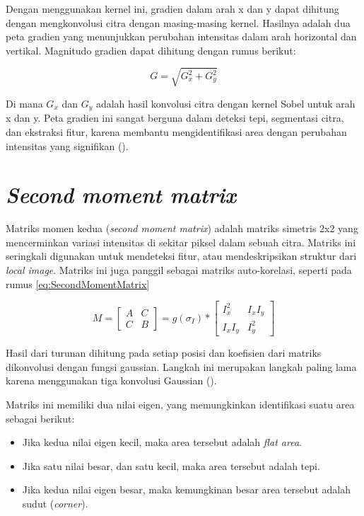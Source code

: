   Dengan menggunakan kernel ini, gradien dalam arah x dan y dapat dihitung dengan mengkonvolusi citra dengan masing-masing kernel. Hasilnya adalah dua peta gradien yang menunjukkan perubahan intensitas dalam arah horizontal dan vertikal. Magnitudo gradien dapat dihitung dengan rumus berikut:

\begin{equation}
  G = \sqrt{G_x^2 + G_y^2}
\end{equation}

  Di mana \(G_x\) dan \(G_y\) adalah hasil konvolusi citra dengan kernel Sobel untuk arah x dan y. Peta gradien ini sangat berguna dalam deteksi tepi, segmentasi citra, dan ekstraksi fitur, karena membantu mengidentifikasi area dengan perubahan intensitas yang signifikan (\cite[hlm. 306--307]{Sanchez2018}).

\section{\emph{Second moment matrix}}
  Matriks momen kedua (\emph{second moment matrix}) adalah matriks simetris 2x2 yang mencerminkan variasi intensitas di sekitar piksel dalam sebuah citra. Matriks ini seringkali digunakan untuk mendeteksi fitur, atau mendeskripsikan struktur dari \emph{local image}.
Matriks ini juga panggil sebagai matriks auto-korelasi, seperti pada rumus \ref{eq:SecondMomentMatrix}

\begin{equation}
  M = 
    \begin{bmatrix}
      A & C \\
      C & B
    \end{bmatrix}
    = g(\sigma_{I}) *
      \begin{bmatrix}
        I_{x}^2 & I_{x}I_{y} \\
        I_{x}I_{y} & I_{y}^2
      \end{bmatrix}
  \label{eq:SecondMomentMatrix}
\end{equation}

Hasil dari turunan dihitung pada setiap posisi dan koefisien dari matriks dikonvolusi dengan fungsi gaussian. Langkah ini merupakan langkah paling lama karena menggunakan tiga konvolusi Gaussian (\cite[hlm. 307]{Sanchez2018}). 

Matriks ini memiliki dua nilai eigen, yang memungkinkan identifikasi suatu area sebagai berikut:

\begin{itemize}
  \item Jika kedua nilai eigen kecil, maka area tersebut adalah \emph{flat area}.
  \item Jika satu nilai besar, dan satu kecil, maka area tersebut adalah tepi.
  \item Jika kedua nilai eigen besar, maka kemungkinan besar area tersebut adalah sudut (\emph{corner}).
\end{itemize}


